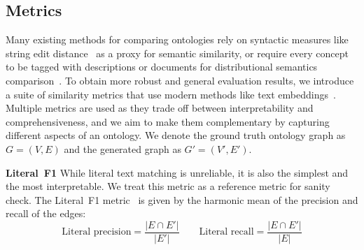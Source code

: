 \documentclass{article}
\newcommand{\fig}[1]{\textcolor{teal}{Figure: #1}}
\begin{document}

\subsection{Metrics}

Many existing methods for comparing ontologies rely on syntactic measures like string edit distance~\cite{Ehrig2005SimilarityFO} as a proxy for semantic similarity, or require every concept to be tagged with descriptions or documents for distributional semantics comparison~\cite{Zavitsanos2011GoldSE}. To obtain more robust and general evaluation results, we introduce a suite of similarity metrics that use modern methods like text embeddings~\cite{reimers-2019-sentence-bert}. Multiple metrics are used as they trade off between interpretability and comprehensiveness, and we aim to make them complementary by capturing different aspects of an ontology. We denote the ground truth ontology graph as $G = (V, E)$ and the generated graph as $G' = (V', E')$.

\textbf{Literal~F1 }
While literal text matching is unreliable, it is also the simplest and the most interpretable. We treat this metric as a reference metric for sanity check. The Literal~F1 metric~\cite{Kashyap2005TaxaMinerAE} is given by the harmonic mean of the precision and recall of the edges:
\[
    \text{Literal precision} = \frac{|E \cap E'|}{|E'|} \qquad
    \text{Literal recall} = \frac{|E \cap E'|}{|E|}
\]
\end{document}
